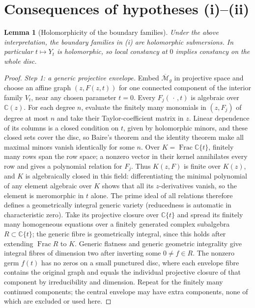 \documentclass[11pt]{article}
\newcommand{\M}{\mathcal M}
\newcommand{\cl}[1]{\overline{#1}}
\newtheorem{lemma}[theorem]{Lemma}
\theoremstyle{remark}
\begin{document}
\section{Consequences of hypotheses (i)--(ii)}\label{sec:hyp}


\begin{lemma}[Holomorphicity of the boundary families]\label{lem:regularity}
Under the above interpretation, the boundary families in (i)
are holomorphic submersions. In particular \(t\mapsto Y_t\)
is holomorphic, so local constancy at \(0\) implies constancy
on the whole disc.
\end{lemma}
\begin{proof}
\emph{Step 1: a generic projective envelope.}
Embed \(\cl{\M}_g\) in projective space and choose an affine graph
\((z,F(z,t))\) for one connected component of the interior
family \(V_t\), near any chosen parameter \(t=0\).
Every \(F_j(\,\cdot\,,t)\) is algebraic over \(\mathbb C(z)\).
For each degree \(n\), evaluate the finitely many monomials
in \((z,F_j)\) of degree at most \(n\) and take their
Taylor-coefficient matrix in \(z\).
Linear dependence of its columns is a closed condition on
\(t\), given by holomorphic minors, and these closed sets cover
the disc, so Baire's theorem and the identity theorem make all
maximal minors vanish identically for some \(n\).
Over \(K=\operatorname{Frac}\mathbb C\{t\}\), finitely many
rows span the row space; a nonzero vector in their kernel
annihilates every row and gives a polynomial relation for \(F_j\).
Thus \(K(z,F)\) is finite over \(K(z)\), and
\(K\) is algebraically closed in this field:
differentiating the minimal polynomial of any element
algebraic over \(K\) shows that all its \(z\)-derivatives
vanish, so the element is meromorphic in \(t\) alone.
The prime ideal of all relations therefore defines a
geometrically integral generic variety \cite[Tag 037P]{Stacks}
(reducedness is automatic in characteristic zero). Take its
projective closure over \(\mathbb C\{t\}\) and spread its finitely
many homogeneous equations over a finitely generated complex
subalgebra \(R\subset\mathbb C\{t\}\); the generic fibre
is geometrically integral, since this holds after extending
\(\operatorname{Frac}R\) to \(K\). Generic flatness and
generic geometric integrality
\cite[Tags 052A, 0559, 0578]{Stacks} give integral fibres
of dimension two after inverting some \(0\ne f\in R\).
The nonzero germ \(f(t)\) has no zeros on a small punctured disc,
where each envelope fibre contains the original graph and equals
the individual projective closure of that component by
irreducibility and dimension. Repeat for the finitely many continued components;
the central envelope may have extra components, none of which are
excluded or used here.


\end{proof}
\end{document}
